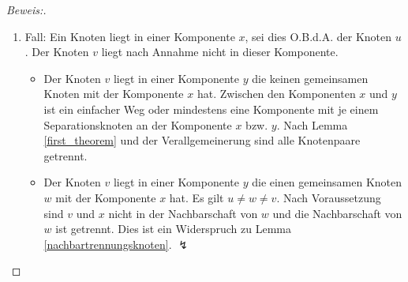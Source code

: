 \begin{proof}[Beweis:]
\begin{enumerate}
\begin{itemize}
\end{itemize}  
\item Fall: Ein Knoten liegt in einer Komponente $x$, sei dies O.B.d.A. der Knoten $u$. Der Knoten $v$ liegt nach Annahme nicht in dieser Komponente. 
\begin{itemize}
\item Der Knoten $v$ liegt in einer Komponente $y$ die keinen gemeinsamen Knoten mit der Komponente $x$ hat. Zwischen den Komponenten $x$ und $y$ ist ein einfacher Weg oder mindestens eine Komponente mit je einem Separationsknoten an der Komponente $x$ bzw. $y$. Nach Lemma \ref{first_theorem} und der Verallgemeinerung sind alle Knotenpaare getrennt.
\item Der Knoten $v$ liegt in einer Komponente $y$ die einen gemeinsamen Knoten $w$ mit der Komponente $x$ hat. Es gilt $u \neq w \neq v$. Nach Voraussetzung sind $v$ und $x$ nicht in der Nachbarschaft von $w$ und die Nachbarschaft von $w$ ist getrennt. Dies ist ein Widerspruch zu Lemma \ref{nachbartrennungsknoten}. $\lightning$
\end{itemize}  
\end{enumerate}
\vspace{-2mm}
\end{proof}

\vspace{-12mm}
